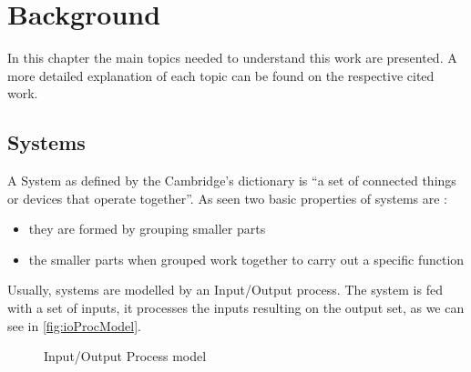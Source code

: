 
\chapter{Background}
\label{cha:background}
In this chapter the main topics needed to understand this work are presented. A more
detailed explanation of each topic can be found on the respective cited work.
\section{Systems}

A System as defined by the Cambridge's dictionary is ``a set of connected things
or devices that operate together''. As seen two basic properties of systems are
:
\begin{itemize}
\item they are formed by grouping smaller parts
\item the smaller parts when grouped work together to carry out a specific
  function
\end{itemize}

Usually, systems are modelled by an Input\slash Output process. The system is fed with a
set of inputs, it processes the inputs resulting on the output set, as we can see
in \autoref{fig:ioProcModel}.

\begin{figure}[H]
  \centering
  \caption{Input\slash Output Process model}
    \label{fig:ioProcModel}
\end{figure}

